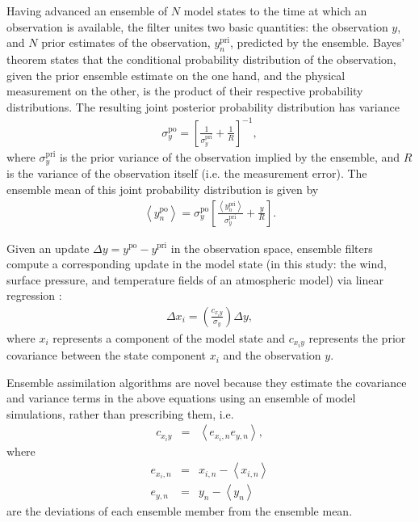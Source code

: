 Having advanced an ensemble of $N$ model states to the time at which an observation is available, 
the filter unites two basic quantities: the observation $y$, and $N$ prior estimates of the observation, $y^{\text{pri}}_{n}$, predicted by the ensemble. 
Bayes' theorem states that the conditional probability distribution of the observation, given the prior ensemble estimate on the one hand, and the physical measurement on the other, is the product of their respective probability distributions.
The resulting joint posterior probability distribution has variance 
\begin{eqnarray}
	\sigma_y^{\text{po}} = 
\left[
	\frac{1}{\sigma_y^{\text{pri}}}
	+
	\frac{1}{R}
\right]^{-1},
\label{eq:sigma_a}
\end{eqnarray}
where $\sigma_y^{\text{pri}}$ is  the prior variance of the observation implied by the ensemble, and $R$ is the variance of the observation itself (i.e. the measurement error).
The ensemble mean of this joint probability distribution is given by
\begin{eqnarray}
	\left< y^{\text{po}}_n \right> = \sigma_y^{\text{po}} 
	\left[
		\frac{\left< y^{\text{pri}}_n \right>}{\sigma_y^{\text{pri}}} +
		\frac{y}{R} 
	\right].
\label{eq:y_a}
\end{eqnarray}

Given an update $\Delta y =  y^{\text{po}} - y^{\text{pri}}$ in the observation space, ensemble filters compute a corresponding update in the model state (in this study: the wind, surface pressure, and temperature fields of an atmospheric model) via linear regression \citep{Anderson2003}:
\begin{eqnarray}
 \Delta x_{i} = 
\left(
	\frac{c_{x_iy}}{\sigma_y}
\right)
\Delta y,
\label{eq:state_update}
\end{eqnarray}
where $x_i$ represents a component of the model state and $c_{x_iy}$ represents the prior covariance between the state component $x_i$ and the observation $y$.

Ensemble assimilation algorithms are novel because they estimate the covariance and variance terms in the above equations using an ensemble of model simulations, rather than prescribing them, i.e. 
\begin{eqnarray}
c_{x_iy} &=& 
\left<
e_{{x_i},n} 
e_{{y},n}
\right>,
\label{eq:covariance} 
\end{eqnarray}
%
%
%
where 
\begin{eqnarray}
	e_{{x_i},n} &=& x_{i,n} - \left< x_{i,n} \right>   \label{eq:exn} \\
	e_{y,n} &=& y_{n} - \left< y_{n} \right>    \label{eq:eyn}
\end{eqnarray}
are the deviations of each ensemble member from the ensemble mean.

